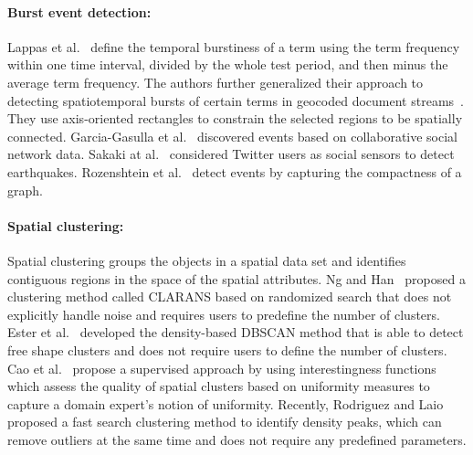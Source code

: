 \paragraph{Burst event detection:}
Lappas et al.~\cite{lappas2009burstiness} define the temporal burstiness of a term using
the term frequency within one time interval, divided by the whole test period, and then 
minus the average term frequency. The authors further generalized their approach to detecting spatiotemporal bursts of certain terms in geocoded document streams~\cite{lappas2012spatiotemporal}. They use axis-oriented rectangles to constrain the selected regions to be spatially connected. Garcia-Gasulla et al.~\cite{garcia2014detection} discovered events based on collaborative social network data. Sakaki at al.~\cite{sakaki2010earthquake} considered Twitter users as social sensors to detect earthquakes. Rozenshtein et al.~\cite{rozenshtein2014event} detect events by capturing the compactness of a graph.

\paragraph{Spatial clustering:}
Spatial clustering groups the objects in a spatial data set and identifies contiguous regions in the space of the spatial attributes. Ng and Han~\cite{ng1994cient} proposed a clustering method called CLARANS based on randomized search that does not explicitly handle noise and requires users to predefine the number 
of clusters. Ester et al.~\cite{ester1996density} developed the density-based DBSCAN method
that is able to detect free shape clusters and does not require users to define the number of clusters. Cao et al.~\cite{cao2013analyzing} propose a supervised approach by using interestingness functions which assess the quality of spatial clusters based on uniformity measures to capture a domain expert's notion of uniformity. Recently, Rodriguez and Laio~\cite{rodriguez2014clustering} proposed a fast search clustering method to identify density peaks, which can remove outliers at the same time and does not require any predefined parameters.

